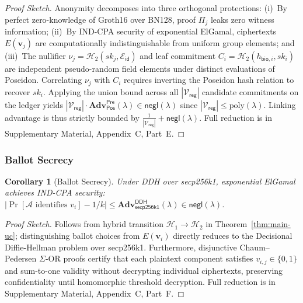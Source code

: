 \documentclass[10pt,letterpaper,journal]{IEEEtran}
\newtheorem{corollary}[theorem]{Corollary}
\begin{document}
\begin{proof}[Proof Sketch]
Anonymity decomposes into three orthogonal protections: (i)~By perfect zero-knowledge of Groth16 over BN128, proof $\Pi_j$ leaks zero witness information; (ii)~By IND-CPA security of exponential ElGamal, ciphertexts $E(\mathbf{v}_j)$ are computationally indistinguishable from uniform group elements; and (iii)~The nullifier $\nu_j = \mathcal{H}_2(sk_j, \mathcal{E}_{\mathsf{id}})$ and leaf commitment $C_i = \mathcal{H}_2(h_{\mathsf{bio},i}, sk_i)$ are independent pseudo-random field elements under distinct evaluations of Poseidon. Correlating $\nu_j$ with $C_i$ requires inverting the Poseidon hash relation to recover $sk_i$. Applying the union bound across all $|\mathcal{V}_{\mathsf{reg}}|$ candidate commitments on the ledger yields $|\mathcal{V}_{\mathsf{reg}}| \cdot \mathbf{Adv}_{\mathsf{Pos}}^{\mathsf{Pre}}(\lambda) \in \mathsf{negl}(\lambda)$ since $|\mathcal{V}_{\mathsf{reg}}| \leq \mathrm{poly}(\lambda)$. Linking advantage is thus strictly bounded by $\frac{1}{|\mathcal{V}_{\mathsf{reg}}|} + \mathsf{negl}(\lambda)$. Full reduction is in Supplementary Material, Appendix~C, Part~E.
\end{proof}

\subsubsection{Ballot Secrecy}
\label{sec:secrecy}

\begin{corollary}[Ballot Secrecy]
\label{thm:secrecy}
Under DDH over secp256k1, exponential ElGamal achieves IND-CPA security: $|\Pr[\mathcal{A}\text{ identifies } v_i] - 1/k| \leq \mathbf{Adv}^{\mathsf{DDH}}_{\mathsf{secp256k1}}(\lambda) \in \mathsf{negl}(\lambda)$.
\end{corollary}

\begin{proof}[Proof Sketch]
Follows from hybrid transition $\mathcal{H}_1 \rightarrow \mathcal{H}_2$ in Theorem~\ref{thm:main-uc}; distinguishing ballot choices from $E(\mathbf{v}_i)$ directly reduces to the Decisional Diffie-Hellman problem over secp256k1. Furthermore, disjunctive Chaum--Pedersen $\Sigma$-OR proofs certify that each plaintext component satisfies $v_{i,j} \in \{0, 1\}$ and sum-to-one validity without decrypting individual ciphertexts, preserving confidentiality until homomorphic threshold decryption. Full reduction is in Supplementary Material, Appendix~C, Part~F.
\end{proof}
\end{document}
